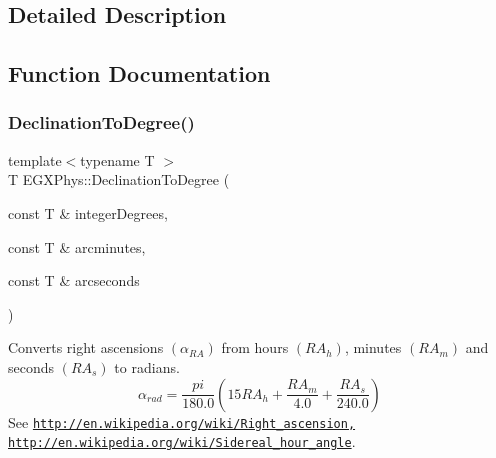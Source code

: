 \subsection{Detailed Description}


\subsection{Function Documentation}
\mbox{\label{group___e_g_x_phys-_astrophysics-_declination_gadcadb4f709a5115a8edb18c872af9eda}} 
\subsubsection{\texorpdfstring{Declination\+To\+Degree()}{DeclinationToDegree()}}
{\footnotesize\ttfamily template$<$typename T $>$ \\
T E\+G\+X\+Phys\+::\+Declination\+To\+Degree (\begin{DoxyParamCaption}\item[{const T \&}]{integer\+Degrees,  }\item[{const T \&}]{arcminutes,  }\item[{const T \&}]{arcseconds }\end{DoxyParamCaption})}



Converts right ascensions $(\alpha_{RA})$ from hours $(RA_h)$, minutes $(RA_m)$ and seconds $(RA_s)$ to radians. \[\alpha_{rad}=\frac{pi}{180.0}(15 RA_h + \frac{RA_m}{4.0} + \frac{RA_s}{240.0})\] See \href{http://en.wikipedia.org/wiki/Right_ascension,}{\tt http\+://en.\+wikipedia.\+org/wiki/\+Right\+\_\+ascension,} \href{http://en.wikipedia.org/wiki/Sidereal_hour_angle}{\tt http\+://en.\+wikipedia.\+org/wiki/\+Sidereal\+\_\+hour\+\_\+angle}. 


